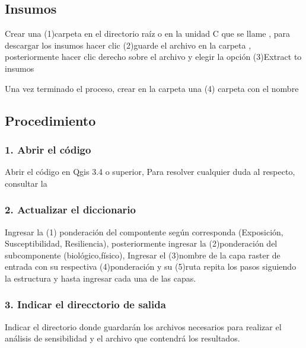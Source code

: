 \documentclass[letterpaper,10pt,spanish]{sphinxmanual}
\begin{document}
\subsection{Insumos}
\label{\detokenize{analisis:insumos}}
Crear una (1)carpeta en el directorio raíz o en la unidad C que se llame ,
para descargar los insumos hacer clic  (2)guarde el archivo 
en la carpeta , posteriormente hacer clic derecho sobre el archivo  y elegir la opción (3)Extract to insumos

\noindent{}

Una vez terminado el proceso, crear en la carpeta  una (4) carpeta con el nombre 

\noindent{}


\subsection{Procedimiento}
\label{\detokenize{analisis:procedimiento}}

\subsubsection{1. Abrir el código}
\label{\detokenize{analisis:abrir-el-codigo}}
Abrir el código  en Qgis 3.4 o superior,
Para resolver cualquier duda al respecto, consultar la 


\subsubsection{2. Actualizar el diccionario}
\label{\detokenize{analisis:actualizar-el-diccionario}}
Ingresar la (1) ponderación del compontente según corresponda (Exposición, Susceptibilidad, Resiliencia), posteriormente
ingresar la (2)ponderación del subcomponente (biológico,físico),
Ingresar el (3)nombre de la capa raster de entrada con su respectiva (4)ponderación y su (5)ruta
repita los pasos siguiendo la estructura y hasta ingresar cada una de las capas.

\noindent{}


\subsubsection{3. Indicar el direcctorio de salida}
\label{\detokenize{analisis:indicar-el-direcctorio-de-salida}}
Indicar el directorio donde guardarán los archivos necesarios para realizar el análisis de sensibilidad
y el archivo   que contendrá los resultados.
\end{document}
